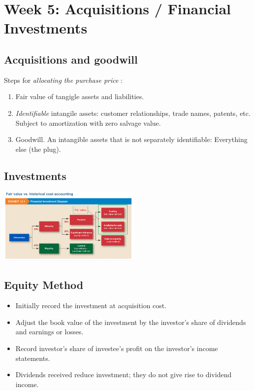 \section*{Week 5: Acquisitions / Financial Investments}

\subsection*{Acquisitions and goodwill}


Steps for \textit{allocating the purchase price} :
\begin{enumerate}[noitemsep,topsep=0pt]
	\item Fair value of tangigle assets and liabilities.
	\item \textit{Identifiable} intangile assets: customer relationships, trade names, patents, etc. Subject to amortization with zero salvage value.
	\item Goodwill.  An intangible assets that is not separately identifiable: Everything else (the plug).
\end{enumerate}

\subsection*{Investments}

\includegraphics[width=7cm]{assets/fair_value_vs_historical_acct}

\subsection*{Equity Method}

\begin{itemize}[noitemsep,topsep=0pt]
	\item Initially record the investment at acquisition cost.
	\item Adjust the book value of the investment by the investor’s share of dividends and
	earnings or losses.
	\item Record investor’s share of investee’s profit on the investor’s income statements.
	\item Dividends received reduce investment; they do not give rise to dividend income.
\end{itemize}

